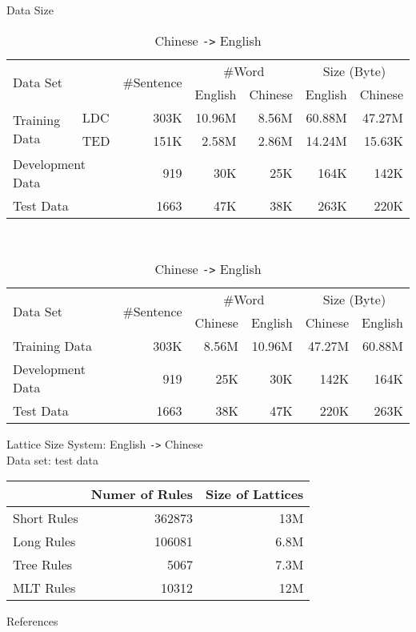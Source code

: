 \documentclass[18pt]{beamer}
\begin{document}
\begin{frame}{Data Size}

\begin{table}
\centering
\small
\caption{English \texttt{->} Chinese}
\begin{tabular}{|ll|r|r|r|r|r|}
\hline
\multicolumn{2}{|l|}{\multirow{2}{*}{Data Set}} & \multirow{2}{*}{\#Sentence} & \multicolumn{2}{c|}{\#Word} & \multicolumn{2}{c|}{Size (Byte)}\\ \cline{4-7}
& & & English & Chinese & English & Chinese \\
\hline
\multirow{2}{*}{Training Data} & \multicolumn{1}{|l|}{LDC} & 303K & 10.96M & 8.56M & 60.88M & 47.27M \\ \cline{2-7}
& \multicolumn{1}{|l|}{TED} & 151K & 2.58M & 2.86M & 14.24M & 15.63K \\ \hline
\multicolumn{2}{|l|}{Development Data} & 919 & 30K & 25K & 164K & 142K \\ \hline
\multicolumn{2}{|l|}{Test Data} & 1663 & 47K & 38K & 263K & 220K \\ \hline
\end{tabular}\bigskip\\
\caption{Chinese \texttt{->} English}
\begin{tabular}{|l|r|r|r|r|r|}
\hline
\multirow{2}{*}{Data Set} & \multirow{2}{*}{\#Sentence} & \multicolumn{2}{c|}{\#Word} & \multicolumn{2}{c|}{Size (Byte)}\\ \cline{3-6}
& & Chinese & English & Chinese & English \\
\hline
Training Data & 303K & 8.56M & 10.96M & 47.27M & 60.88M\\ \hline
Development Data & 919 & 25K & 30K & 142K & 164K \\ \hline
Test Data & 1663 & 38K & 47K & 220K & 263K \\ \hline
\end{tabular}
\end{table}
\end{frame}

\begin{frame}{Lattice Size}
System: English \texttt{->} Chinese\\
Data set: test data
\begin{table}
\begin{tabular}{|l|r|r|}
\hline
& Numer of Rules & Size of Lattices \\ \hline
Short Rules & 362873 & 13M \\ \hline
Long Rules & 106081 & 6.8M \\ \hline
Tree Rules & 5067 & 7.3M\\ \hline
MLT Rules & 10312 & 12M \\ \hline
\end{tabular}
\end{table}
\end{frame}

\nocite{*}
\begin{frame}[allowframebreaks]{References}
\printbibliography
\end{frame}

\backupend
\end{document}

